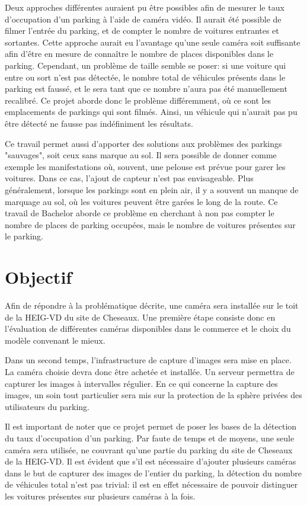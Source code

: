 Deux approches différentes auraient pu être possibles afin de mesurer le taux d'occupation d'un parking à l'aide de caméra vidéo. Il aurait été possible de filmer l'entrée du parking, et de compter le nombre de voitures entrantes et sortantes. Cette approche aurait eu l'avantage qu'une seule caméra soit suffisante afin d'être en mesure de connaître le nombre de places disponibles dans le parking. Cependant, un problème de taille semble se poser: si une voiture qui entre ou sort n'est pas détectée, le nombre total de véhicules présents dans le parking est faussé, et le sera tant que ce nombre n'aura pas été manuellement recalibré. Ce projet aborde donc le problème différemment, où ce sont les emplacements de parkings qui sont filmés. Ainsi, un véhicule qui n'aurait pas pu être détecté ne fausse pas indéfiniment les résultats.

Ce travail permet aussi d'apporter des solutions aux problèmes des parkings "sauvages", soit ceux sans marque au sol. Il sera possible de donner comme exemple les manifestations où, souvent, une pelouse est prévue pour garer les voitures. Dans ce cas, l'ajout de capteur n'est pas envisageable. Plus généralement, lorsque les parkings sont en plein air, il y a souvent un manque de marquage au sol, où les voitures peuvent être garées le long de la route. Ce travail de Bachelor aborde ce problème en cherchant à non pas compter le nombre de places de parking occupées, mais le nombre de voitures présentes sur le parking. 

\section{Objectif}
Afin de répondre à la problématique décrite, une caméra sera installée sur le toit de la HEIG-VD du site de Cheseaux. Une première étape consiste donc en l'évaluation de différentes caméras disponibles dans le commerce et le choix du modèle convenant le mieux. 

Dans un second temps, l'infrastructure de capture d'images sera mise en place. La caméra choisie devra donc être achetée et installée. Un serveur permettra de capturer les images à intervalles régulier. En ce qui concerne la capture des images, un soin tout particulier sera mis sur la protection de la sphère privées des utilisateurs du parking.

Il est important de noter que ce projet permet de poser les bases de la détection du taux d'occupation d'un parking. Par faute de temps et de moyens, une seule caméra sera utilisée, ne couvrant qu'une partie du parking du site de Cheseaux de la HEIG-VD. Il est évident que s'il est nécessaire d'ajouter plusieurs caméras dans le but de capturer des images de l'entier du parking, la détection du nombre de véhicules total n'est pas trivial: il est en effet nécessaire de pouvoir distinguer les voitures présentes sur plusieurs caméras à la fois. 

